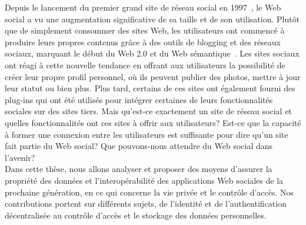 \documentclass[a4paper]{article}
\begin{document}
Depuis le lancement du premier grand site de réseau social en 1997~\cite{ellison2007social}, le Web social a vu une augmentation significative de sa taille et de son utilisation. Plutôt que de simplement consommer des sites Web, les utilisateurs ont commencé à produire leurs propres contenus grâce à des outils de blogging et des réseaux sociaux, marquant le début du Web 2.0 et du Web sémantique~\cite{berners1999weaving}. Les sites sociaux ont réagi à cette nouvelle tendance en offrant aux utilisateurs la possibilité de créer leur propre profil personnel, où ils peuvent publier des photos, mettre à jour leur statut ou bien plus. Plus tard, certains de ces sites ont également fourni des plug-ins qui ont été utilisés pour intégrer certaines de leurs fonctionnalités sociales sur des sites tiers. Mais qu'est-ce exactement un site de réseau social et quelles fonctionnalités ont ces sites à offrir aux utilisateurs? Est-ce que la capacité à former une connexion entre les utilisateurs est suffisante pour dire qu'un site fait partie du Web social? Que pouvons-nous attendre du Web social dans l'avenir?\\


Dans cette thèse, nous allons analyser et proposer des moyens d'assurer la propriété des données et l'interopérabilité des applications Web sociales de la prochaine génération, en ce qui concerne la vie privée et le contrôle d'accès. Nos contributions portent sur différents sujets, de l'identité et de l'authentification décentralisée au contrôle d'accès et le stockage des données personnelles.
\end{document}
